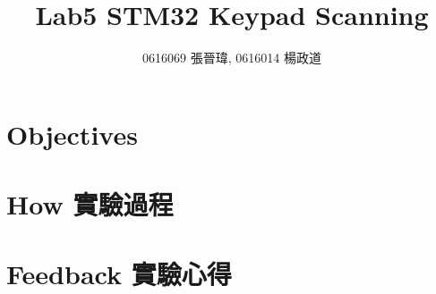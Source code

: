 \title{Lab5 STM32 Keypad Scanning}
\author{0616069 張晉瑋, 0616014 楊政道}
\maketitle
\thispagestyle{fancy}
\section{Objectives}
\paragraph{}
\section{How 實驗過程}
\paragraph{}
\section{Feedback 實驗心得}
\paragraph{}
